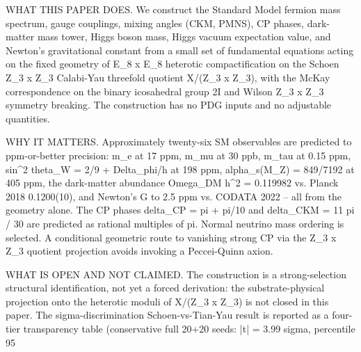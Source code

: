 ﻿\documentclass[reprint,amsmath,amssymb,aps,prd,longbibliography,floatfix]{revtex4-2}
\begin{document}
\iffalse

WHAT THIS PAPER DOES. We construct the Standard Model fermion mass spectrum, gauge couplings, mixing angles (CKM, PMNS), CP phases, dark-matter mass tower, Higgs boson mass, Higgs vacuum expectation value, and Newton's gravitational constant from a small set of fundamental equations acting on the fixed geometry of E_8 x E_8 heterotic compactification on the Schoen Z_3 x Z_3 Calabi-Yau threefold quotient X/(Z_3 x Z_3), with the McKay correspondence on the binary icosahedral group 2I and Wilson Z_3 x Z_3 symmetry breaking. The construction has no PDG inputs and no adjustable quantities.

WHY IT MATTERS. Approximately twenty-six SM observables are predicted to ppm-or-better precision: m_e at 17 ppm, m_mu at 30 ppb, m_tau at 0.15 ppm, sin^2 theta_W = 2/9 + Delta_phi/h at 198 ppm, alpha_s(M_Z) = 849/7192 at 405 ppm, the dark-matter abundance Omega_DM h^2 = 0.119982 vs. Planck 2018 0.1200(10), and Newton's G to 2.5 ppm vs. CODATA 2022 -- all from the geometry alone. The CP phases delta_CP = pi + pi/10 and delta_CKM = 11 pi / 30 are predicted as rational multiples of pi. Normal neutrino mass ordering is selected. A conditional geometric route to vanishing strong CP via the Z_3 x Z_3 quotient projection avoids invoking a Peccei-Quinn axion.

WHAT IS OPEN AND NOT CLAIMED. The construction is a strong-selection structural identification, not yet a forced derivation: the substrate-physical projection onto the heterotic moduli of X/(Z_3 x Z_3) is not closed in this paper. The sigma-discrimination Schoen-vs-Tian-Yau result is reported as a four-tier transparency table (conservative full 20+20 seeds: |t| = 3.99 sigma, percentile 95%
\end{document}
